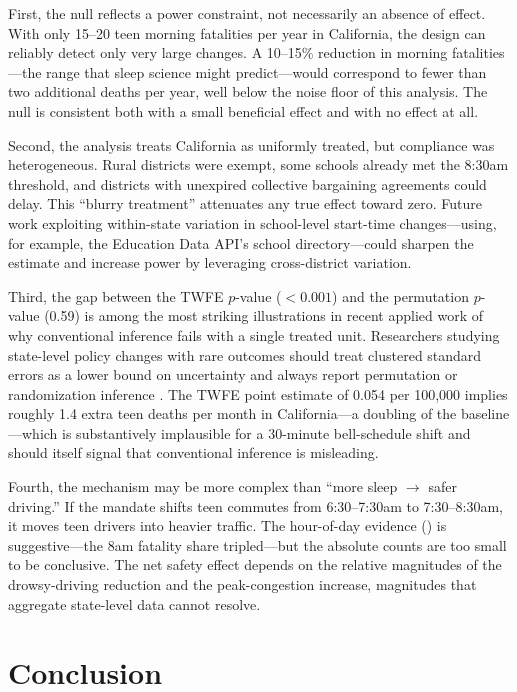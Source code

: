 \documentclass[12pt]{article}
\begin{document}
First, the null reflects a power constraint, not necessarily an absence of effect. With only 15--20 teen morning fatalities per year in California, the design can reliably detect only very large changes. A 10--15\% reduction in morning fatalities---the range that sleep science might predict---would correspond to fewer than two additional deaths per year, well below the noise floor of this analysis. The null is consistent both with a small beneficial effect and with no effect at all.

Second, the analysis treats California as uniformly treated, but compliance was heterogeneous. Rural districts were exempt, some schools already met the 8:30am threshold, and districts with unexpired collective bargaining agreements could delay. This ``blurry treatment'' attenuates any true effect toward zero. Future work exploiting within-state variation in school-level start-time changes---using, for example, the Education Data API's school directory---could sharpen the estimate and increase power by leveraging cross-district variation.

Third, the gap between the TWFE $p$-value ($< 0.001$) and the permutation $p$-value (0.59) is among the most striking illustrations in recent applied work of why conventional inference fails with a single treated unit. Researchers studying state-level policy changes with rare outcomes should treat clustered standard errors as a lower bound on uncertainty and always report permutation or randomization inference \citep{conley2011inference, ferman2019inference}. The TWFE point estimate of 0.054 per 100,000 implies roughly 1.4 extra teen deaths per month in California---a doubling of the baseline---which is substantively implausible for a 30-minute bell-schedule shift and should itself signal that conventional inference is misleading.

Fourth, the mechanism may be more complex than ``more sleep $\rightarrow$ safer driving.'' If the mandate shifts teen commutes from 6:30--7:30am to 7:30--8:30am, it moves teen drivers into heavier traffic. The hour-of-day evidence () is suggestive---the 8am fatality share tripled---but the absolute counts are too small to be conclusive. The net safety effect depends on the relative magnitudes of the drowsy-driving reduction and the peak-congestion increase, magnitudes that aggregate state-level data cannot resolve.

\section{Conclusion}
\end{document}
